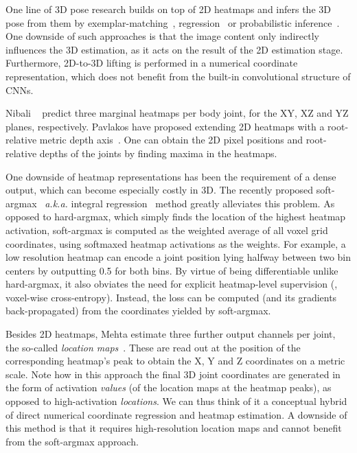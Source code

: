 One line of 3D pose research builds on top of 2D heatmaps and infers the 3D pose from them by exemplar-matching~\cite{Chen17CVPR}, regression~\cite{Martinez17ICCV} or probabilistic inference~\cite{Tome17CVPR}.
One downside of such approaches is that the image content only indirectly influences the 3D estimation, as it acts on the result of the 2D estimation stage.
Furthermore, 2D-to-3D lifting is performed in a numerical coordinate representation, which does not benefit from the built-in convolutional structure of CNNs.

Nibali \etal~\cite{Nibali19WACV} predict three marginal heatmaps per body joint, for the XY, XZ and YZ planes, respectively.
Pavlakos \etal have proposed extending 2D heatmaps with a root-relative metric depth axis~\cite{Pavlakos17CVPR}.
One can obtain the 2D pixel positions and root-relative depths of the joints by finding maxima in the heatmaps.

One downside of heatmap representations has been the requirement of a dense output, which can become especially costly in 3D.
The recently proposed soft-argmax~\cite{Levine16JMLR,Luvizon17Arxiv,Nibali18arXiv} \emph{a.k.a.} integral regression~\cite{Sun18ECCV} method greatly alleviates this problem.
As opposed to hard-argmax, which simply finds the location of the highest heatmap activation, soft-argmax is computed as the weighted average of all voxel grid coordinates, using softmaxed heatmap activations as the weights.
For example, a low resolution heatmap can encode a joint position lying halfway between two bin centers by outputting 0.5 for both bins.
By virtue of being differentiable unlike hard-argmax, it also obviates the need for explicit heatmap-level supervision (\eg, voxel-wise cross-entropy).
Instead, the loss can be computed (and its gradients back-propagated) from the coordinates yielded by soft-argmax.

Besides 2D heatmaps, Mehta \etal estimate three further output channels per joint, the so-called \emph{location maps}~\cite{Mehta17TOG}.
These are read out at the position of the corresponding heatmap's peak to obtain the X, Y and Z coordinates on a metric scale.
Note how in this approach the final 3D joint coordinates are generated in the form of activation \emph{values} (of the location maps at the heatmap peaks), as opposed to high-activation \textit{locations}. We can thus think of it a conceptual hybrid of direct numerical coordinate regression and heatmap estimation.
A downside of this method is that it requires high-resolution location maps and cannot benefit from the soft-argmax approach.

